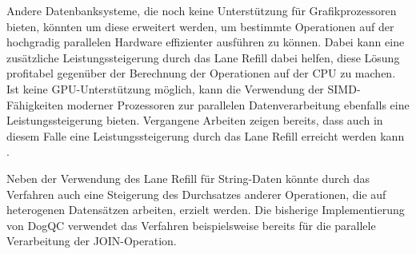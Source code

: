 Andere Datenbanksysteme, die noch keine Unterstützung für Grafikprozessoren bieten, könnten um diese erweitert werden, um bestimmte Operationen auf der hochgradig parallelen Hardware effizienter ausführen zu können.
Dabei kann eine zusätzliche Leistungssteigerung durch das Lane Refill dabei helfen, diese Lösung profitabel gegenüber der Berechnung der Operationen auf der CPU zu machen.
Ist keine GPU-Unterstützung möglich, kann die Verwendung der SIMD-Fähigkeiten moderner Prozessoren zur parallelen Datenverarbeitung ebenfalls eine Leistungssteigerung bieten.
Vergangene Arbeiten zeigen bereits, dass auch in diesem Falle eine Leistungssteigerung durch das Lane Refill erreicht werden kann \cite{Lang2018}.

Neben der Verwendung des Lane Refill für String-Daten könnte durch das Verfahren auch eine Steigerung des Durchsatzes anderer Operationen, die auf heterogenen Datensätzen arbeiten, erzielt werden.
Die bisherige Implementierung von DogQC verwendet das Verfahren beispielsweise bereits für die parallele Verarbeitung der JOIN-Operation.
